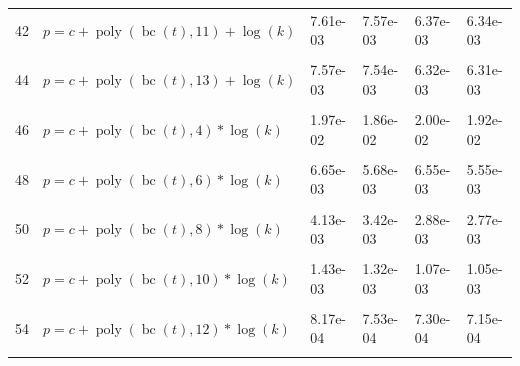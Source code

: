 \documentclass[12pt,a4paper]{article}
\DeclareMathOperator{\bc}{bc}
\DeclareMathOperator{\poly}{poly}
\begin{document}
\begin{longtable}[t]{ll>{\raggedleft\arraybackslash}p{2cm}>{\raggedleft\arraybackslash}p{2cm}>{\raggedleft\arraybackslash}p{2cm}>{\raggedleft\arraybackslash}p{2cm}}
42 & $p = c + \poly\left( \bc(t), 11 \right) + \log(k)$ & 7.61e-03 & 7.57e-03 & 6.37e-03 & 6.34e-03\\
\cellcolor{gray!6}{43} & \cellcolor{gray!6}{$p = c + \poly\left( \bc(t), 12 \right) + \log(k)$} & \cellcolor{gray!6}{7.59e-03} & \cellcolor{gray!6}{7.55e-03} & \cellcolor{gray!6}{6.34e-03} & \cellcolor{gray!6}{6.32e-03}\\
44 & $p = c + \poly\left( \bc(t), 13 \right) + \log(k)$ & 7.57e-03 & 7.54e-03 & 6.32e-03 & 6.31e-03\\
\cellcolor{gray!6}{45} & \cellcolor{gray!6}{$p = c + \poly\left( \bc(t), 3 \right) * \log(k)$} & \cellcolor{gray!6}{3.25e-02} & \cellcolor{gray!6}{1.98e-02} & \cellcolor{gray!6}{2.11e-02} & \cellcolor{gray!6}{1.96e-02}\\
46 & $p = c + \poly\left( \bc(t), 4 \right) * \log(k)$ & 1.97e-02 & 1.86e-02 & 2.00e-02 & 1.92e-02\\
\cellcolor{gray!6}{47} & \cellcolor{gray!6}{$p = c + \poly\left( \bc(t), 5 \right) * \log(k)$} & \cellcolor{gray!6}{1.64e-02} & \cellcolor{gray!6}{1.59e-02} & \cellcolor{gray!6}{1.34e-02} & \cellcolor{gray!6}{1.32e-02}\\
48 & $p = c + \poly\left( \bc(t), 6 \right) * \log(k)$ & 6.65e-03 & 5.68e-03 & 6.55e-03 & 5.55e-03\\
\cellcolor{gray!6}{49} & \cellcolor{gray!6}{$p = c + \poly\left( \bc(t), 7 \right) * \log(k)$} & \cellcolor{gray!6}{6.11e-03} & \cellcolor{gray!6}{4.95e-03} & \cellcolor{gray!6}{5.14e-03} & \cellcolor{gray!6}{4.57e-03}\\
50 & $p = c + \poly\left( \bc(t), 8 \right) * \log(k)$ & 4.13e-03 & 3.42e-03 & 2.88e-03 & 2.77e-03\\
\cellcolor{gray!6}{51} & \cellcolor{gray!6}{$p = c + \poly\left( \bc(t), 9 \right) * \log(k)$} & \cellcolor{gray!6}{2.62e-03} & \cellcolor{gray!6}{2.39e-03} & \cellcolor{gray!6}{2.59e-03} & \cellcolor{gray!6}{2.40e-03}\\
52 & $p = c + \poly\left( \bc(t), 10 \right) * \log(k)$ & 1.43e-03 & 1.32e-03 & 1.07e-03 & 1.05e-03\\
\cellcolor{gray!6}{53} & \cellcolor{gray!6}{$p = c + \poly\left( \bc(t), 11 \right) * \log(k)$} & \cellcolor{gray!6}{9.91e-04} & \cellcolor{gray!6}{9.04e-04} & \cellcolor{gray!6}{9.96e-04} & \cellcolor{gray!6}{9.13e-04}\\
54 & $p = c + \poly\left( \bc(t), 12 \right) * \log(k)$ & 8.17e-04 & 7.53e-04 & 7.30e-04 & 7.15e-04\\
\cellcolor{gray!6}{55} & \cellcolor{gray!6}{$p = c + \poly\left( \bc(t), 13 \right) * \log(k)$} & \cellcolor{gray!6}{5.98e-04} & \cellcolor{gray!6}{5.84e-04} & \cellcolor{gray!6}{6.22e-04} & \cellcolor{gray!6}{6.19e-04}\\

\end{longtable}
\end{document}
